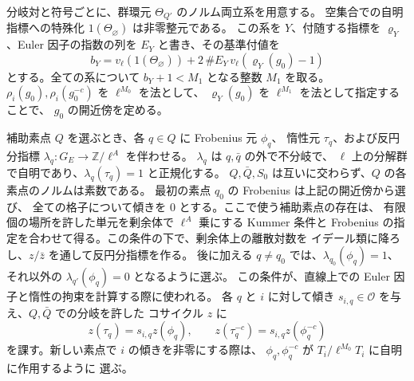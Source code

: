 分岐対と符号ごとに、群環元 \(\Theta_{Q'}\) のノルム両立系を用意する。
空集合での自明指標への特殊化 \(1(\Theta_\varnothing)\) は非零整元である。
この系を \(Y\)、付随する指標を \(\varrho_Y\)、Euler 因子の指数の列を
\(E_Y\) と書き、その基準付値を
\[
 b_Y=v_\ell(1(\Theta_\varnothing))+
              2\,\#E_Y\,v_\ell(\varrho_Y(g_0)-1)
\]
とする。全ての系について \(b_Y+1<M_1\) となる整数 \(M_1\) を取る。
\(\rho_i(g_0),\rho_i(g_0^{-c})\) を \(\ell^{M_0}\) を法として、
\(\varrho_Y(g_0)\) を \(\ell^{M_1}\) を法として指定することで、
\(g_0\) の開近傍を定める。



補助素点 \(Q\) を選ぶとき、各 \(q\in Q\) に Frobenius 元 \(\phi_q\)、
惰性元 \(\tau_q\)、および反円分指標
\(\lambda_q\colon G_E\to\mathbb Z/\ell^A\) を伴わせる。
\(\lambda_q\) は \(q,\bar q\) の外で不分岐で、
\(\ell\) 上の分解群で自明であり、\(\lambda_q(\tau_q)=1\) と正規化する。
\(Q,\bar Q,S_0\) は互いに交わらず、\(Q\) の各素点のノルムは素数である。
最初の素点 \(q_0\) の Frobenius は上記の開近傍から選び、
全ての格子について傾きを \(0\) とする。ここで使う補助素点の存在は、
有限個の場所を許した単元を剰余体で \(\ell^A\) 乗にする Kummer 条件と
Frobenius の指定を合わせて得る。この条件の下で、剰余体上の離散対数を
イデール類に降ろし、\(z/\bar z\) を通して反円分指標を作る。
後に加える \(q\ne q_0\) では、\(\lambda_{q_0}(\phi_q)=1\)、
それ以外の \(\lambda_{q'}(\phi_q)=0\) となるように選ぶ。
この条件が、直線上での Euler 因子と惰性の拘束を計算する際に使われる。
各 \(q\) と \(i\) に対して傾き \(s_{i,q}\in\mathcal O\) を与え、\(Q,\bar Q\) での分岐を許した
コサイクル \(z\) に
\[
 z(\tau_q)=s_{i,q}z(\phi_q),\qquad
 z(\tau_q^{-c})=s_{i,q}z(\phi_q^{-c})
\]
を課す。新しい素点で \(i\) の傾きを非零にする際は、
\(\phi_q,\phi_q^{-c}\) が \(T_i/\ell^{M_0}T_i\) に自明に作用するように
選ぶ。


